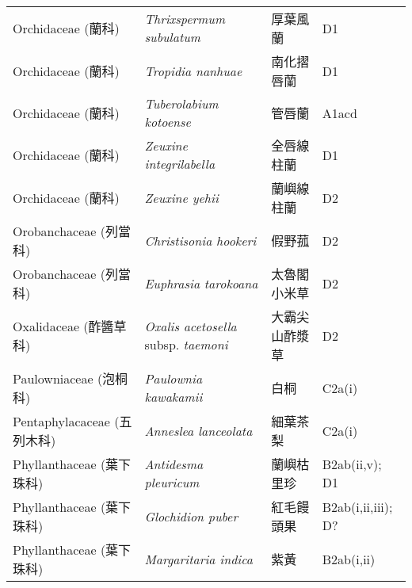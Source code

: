 \begin{longtable}{p{3cm}p{5cm}p{3cm}p{4cm}}
    Orchidaceae (蘭科) & \textit{Thrixspermum subulatum}  & 厚葉風蘭 & D1 \index{Thrixspermum@\textit{Thrixspermum}!subulatum@\textit{subulatum}}  \index{厚葉風蘭} \\
    Orchidaceae (蘭科) & \textit{Tropidia nanhuae}  & 南化摺唇蘭 & D1 \index{Tropidia@\textit{Tropidia}!nanhuae@\textit{nanhuae}}  \index{南化摺唇蘭} \\
    Orchidaceae (蘭科) & \textit{Tuberolabium kotoense}  & 管唇蘭 & A1acd \index{Tuberolabium@\textit{Tuberolabium}!kotoense@\textit{kotoense}}  \index{管唇蘭} \\
    Orchidaceae (蘭科) & \textit{Zeuxine integrilabella}  & 全唇線柱蘭 & D1 \index{Zeuxine@\textit{Zeuxine}!integrilabella@\textit{integrilabella}}  \index{全唇線柱蘭} \\
    Orchidaceae (蘭科) & \textit{Zeuxine yehii}  & 蘭嶼線柱蘭 & D2 \index{Zeuxine@\textit{Zeuxine}!yehii@\textit{yehii}}  \index{蘭嶼線柱蘭} \\
    Orobanchaceae (列當科) & \textit{Christisonia hookeri}  & 假野菰 & D2 \index{Christisonia@\textit{Christisonia}!hookeri@\textit{hookeri}}  \index{假野菰} \\
    Orobanchaceae (列當科) & \textit{Euphrasia tarokoana}  & 太魯閣小米草 & D2 \index{Euphrasia@\textit{Euphrasia}!tarokoana@\textit{tarokoana}}  \index{太魯閣小米草} \\
    Oxalidaceae (酢醬草科) & \textit{Oxalis acetosella} subsp. \textit{taemoni}  & 大霸尖山酢漿草 & D2 \index{Oxalis@\textit{Oxalis}!acetosella@\textit{acetosella}!subsp. taemoni@subsp. \textit{taemoni}}  \index{大霸尖山酢漿草} \\
    Paulowniaceae (泡桐科) & \textit{Paulownia kawakamii}  & 白桐 & C2a(i) \index{Paulownia@\textit{Paulownia}!kawakamii@\textit{kawakamii}}  \index{白桐} \\
    Pentaphylacaceae (五列木科) & \textit{Anneslea lanceolata}  & 細葉茶梨 & C2a(i) \index{Anneslea@\textit{Anneslea}!lanceolata@\textit{lanceolata}}  \index{細葉茶梨} \\
    Phyllanthaceae (葉下珠科) & \textit{Antidesma pleuricum}  & 蘭嶼枯里珍 & B2ab(ii,v); D1 \index{Antidesma@\textit{Antidesma}!pleuricum@\textit{pleuricum}}  \index{蘭嶼枯里珍} \\
    Phyllanthaceae (葉下珠科) & \textit{Glochidion puber}  & 紅毛饅頭果 & B2ab(i,ii,iii); D? \index{Glochidion@\textit{Glochidion}!puber@\textit{puber}}  \index{紅毛饅頭果} \\
    Phyllanthaceae (葉下珠科) & \textit{Margaritaria indica}  & 紫黃 & B2ab(i,ii) \index{Margaritaria@\textit{Margaritaria}!indica@\textit{indica}}  \index{紫黃} \\

\end{longtable}
